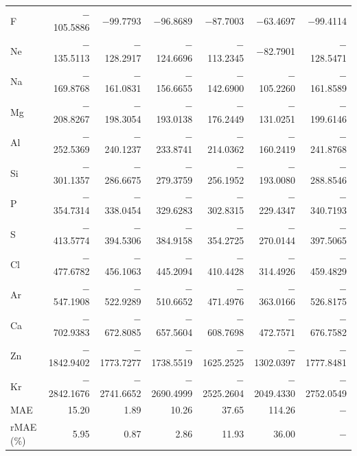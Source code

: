 \documentclass[%
 reprint,
 amsmath,amssymb,
 aps,
pra,
]{revtex4-2}
\begin{document}
\begin{table}[t]
\begin{ruledtabular}
\begin{tabular}{lrrrrrr}
F  & $-$105.5886 & $-$99.7793 & $-$96.8689 & $-$87.7003 & $-$63.4697 & $-$99.4114 \\
Ne & $-$135.5113 & $-$128.2917 & $-$124.6696 & $-$113.2345 & $-$82.7901 & $-$128.5471 \\
Na & $-$169.8768 & $-$161.0831 & $-$156.6655 & $-$142.6900 & $-$105.2260 & $-$161.8589 \\
Mg & $-$208.8267 & $-$198.3054 & $-$193.0138 & $-$176.2449 & $-$131.0251 & $-$199.6146 \\
Al & $-$252.5369 & $-$240.1237 & $-$233.8741 & $-$214.0362 & $-$160.2419 & $-$241.8768 \\
Si & $-$301.1357 & $-$286.6675 & $-$279.3759 & $-$256.1952 & $-$193.0080 & $-$288.8546 \\
P  & $-$354.7314 & $-$338.0454 & $-$329.6283 & $-$302.8315 & $-$229.4347 & $-$340.7193 \\
S  & $-$413.5774 & $-$394.5306 & $-$384.9158 & $-$354.2725 & $-$270.0144 & $-$397.5065 \\
Cl & $-$477.6782 & $-$456.1063 & $-$445.2094 & $-$410.4428 & $-$314.4926 & $-$459.4829 \\
Ar & $-$547.1908 & $-$522.9289 & $-$510.6652 & $-$471.4976 & $-$363.0166 & $-$526.8175 \\
Ca & $-$702.9383 & $-$672.8085 & $-$657.5604 & $-$608.7698 & $-$472.7571 & $-$676.7582 \\
Zn & $-$1842.9402 & $-$1773.7277 & $-$1738.5519 & $-$1625.2525 & $-$1302.0397 & $-$1777.8481 \\
Kr & $-$2842.1676 & $-$2741.6652 & $-$2690.4999 & $-$2525.2604 & $-$2049.4330 & $-$2752.0549 \\
\hline
MAE & 15.20 & 1.89 & 10.26 & 37.65 & 114.26 & $-$ \\
rMAE (\%) & 5.95 & 0.87 & 2.86 & 11.93 & 36.00 & $-$ \\
\end{tabular}
\end{ruledtabular}
\end{table}
\end{document}

